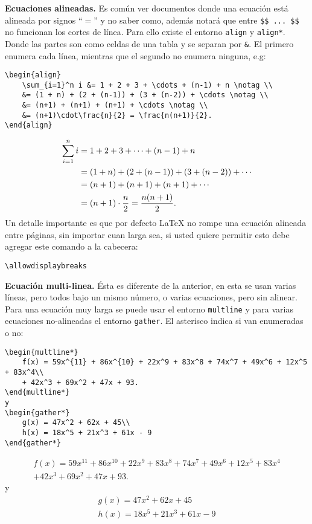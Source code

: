 \textbf{Ecuaciones alineadas.} Es común ver documentos donde una ecuación está alineada por signos ``$=$'' y no saber como, además notará que entre \lstinline|$$ ... $$| no funcionan los cortes de línea. Para ello existe el entorno \texttt{align} y \texttt{align*}. Donde las partes son como celdas de una tabla y se separan por \texttt{\&}. El primero enumera cada línea, mientras que el segundo no enumera ninguna, e.g:
\begin{lstlisting}[basicstyle=\footnotesize\ttfamily, tabsize=4]
\begin{align}
	\sum_{i=1}^n i &= 1 + 2 + 3 + \cdots + (n-1) + n \notag \\
	&= (1 + n) + (2 + (n-1)) + (3 + (n-2)) + \cdots \notag \\
	&= (n+1) + (n+1) + (n+1) + \cdots \notag \\
	&= (n+1)\cdot\frac{n}{2} = \frac{n(n+1)}{2}.
\end{align}
\end{lstlisting}
\begin{align}
	\sum_{i=1}^n i &= 1 + 2 + 3 + \cdots + (n-1) + n \notag \\
	&= (1 + n) + (2 + (n-1)) + (3 + (n-2)) + \cdots \notag \\
	&= (n+1) + (n+1) + (n+1) + \cdots \notag \\
	&= (n+1)\cdot\frac{n}{2} = \frac{n(n+1)}{2}.
\end{align}
Un detalle importante es que por defecto \LaTeX{} no rompe una ecuación alineada entre páginas, sin importar cuan larga sea, si usted quiere permitir esto debe agregar este comando a la cabecera:
\begin{lstlisting}
\allowdisplaybreaks
\end{lstlisting}

\textbf{Ecuación multi-linea.} Ésta es diferente de la anterior, en esta se usan varias líneas, pero todos bajo un mismo número, o varias ecuaciones, pero sin alinear. Para una ecuación muy larga se puede usar el entorno \texttt{multline} y para varias ecuaciones no-alineadas el entorno \texttt{gather}. El asterisco indica si van enumeradas o no:
\begin{lstlisting}
\begin{multline*}
	f(x) = 59x^{11} + 86x^{10} + 22x^9 + 83x^8 + 74x^7 + 49x^6 + 12x^5 + 83x^4\\
	+ 42x^3 + 69x^2 + 47x + 93.
\end{multline*}
y
\begin{gather*}
	g(x) = 47x^2 + 62x + 45\\
	h(x) = 18x^5 + 21x^3 + 61x - 9
\end{gather*}
\end{lstlisting}
\begin{multline*}
	f(x) = 59x^{11} + 86x^{10} + 22x^9 + 83x^8 + 74x^7 + 49x^6 + 12x^5 + 83x^4\\
	+ 42x^3 + 69x^2 + 47x + 93.
\end{multline*}
y
\begin{gather*}
	g(x) = 47x^2 + 62x + 45\\
	h(x) = 18x^5 + 21x^3 + 61x - 9
\end{gather*}

